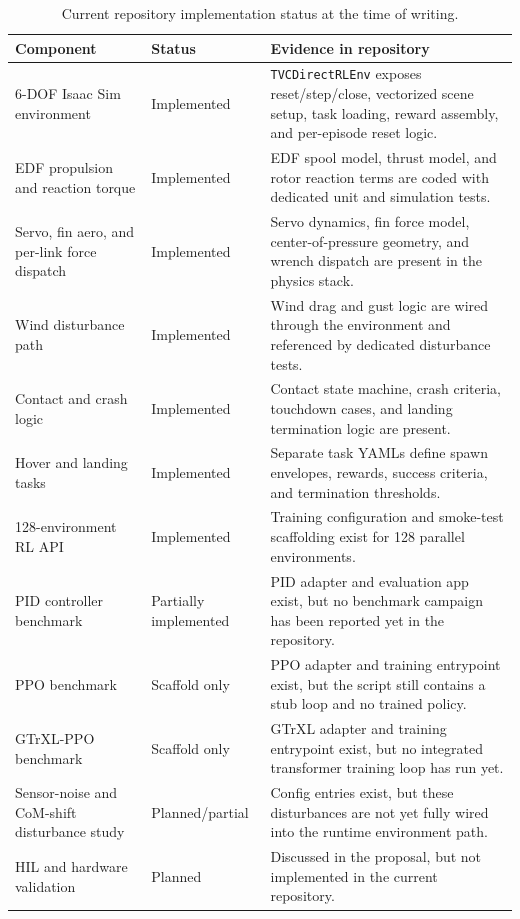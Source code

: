 \documentclass[10pt,twocolumn]{article}
\begin{document}
\begin{table}[!t]
\centering
\caption{Current repository implementation status at the time of writing.}
\label{tab:repo_status}
\scriptsize
\renewcommand{\arraystretch}{0.98}
\begin{tabularx}{\textwidth}{p{1.70in} p{1.05in} X}
\toprule
Component & Status & Evidence in repository \\
\midrule
6-DOF Isaac Sim environment & Implemented & \texttt{TVCDirectRLEnv} exposes reset/step/close, vectorized scene setup, task loading, reward assembly, and per-episode reset logic. \\
EDF propulsion and reaction torque & Implemented & EDF spool model, thrust model, and rotor reaction terms are coded with dedicated unit and simulation tests. \\
Servo, fin aero, and per-link force dispatch & Implemented & Servo dynamics, fin force model, center-of-pressure geometry, and wrench dispatch are present in the physics stack. \\
Wind disturbance path & Implemented & Wind drag and gust logic are wired through the environment and referenced by dedicated disturbance tests. \\
Contact and crash logic & Implemented & Contact state machine, crash criteria, touchdown cases, and landing termination logic are present. \\
Hover and landing tasks & Implemented & Separate task YAMLs define spawn envelopes, rewards, success criteria, and termination thresholds. \\
128-environment RL API & Implemented & Training configuration and smoke-test scaffolding exist for 128 parallel environments. \\
PID controller benchmark & Partially implemented & PID adapter and evaluation app exist, but no benchmark campaign has been reported yet in the repository. \\
PPO benchmark & Scaffold only & PPO adapter and training entrypoint exist, but the script still contains a stub loop and no trained policy. \\
GTrXL-PPO benchmark & Scaffold only & GTrXL adapter and training entrypoint exist, but no integrated transformer training loop has run yet. \\
Sensor-noise and CoM-shift disturbance study & Planned/partial & Config entries exist, but these disturbances are not yet fully wired into the runtime environment path. \\
HIL and hardware validation & Planned & Discussed in the proposal, but not implemented in the current repository. \\
\bottomrule
\end{tabularx}
\end{table}
\end{document}
